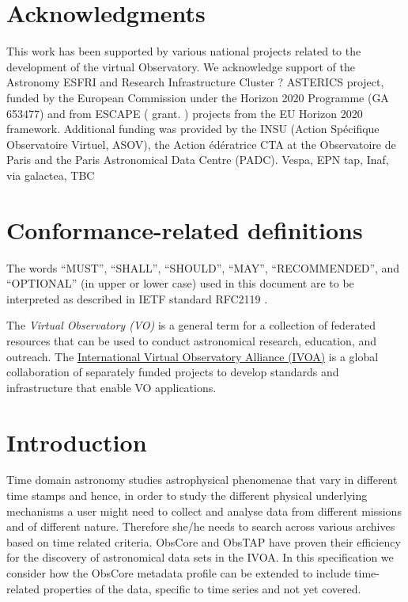 \documentclass[11pt,a4paper]{ivoa}
\begin{document}
\section*{Acknowledgments}
This work has been supported by various national projects related to the development of the virtual Observatory.
 We acknowledge support of the Astronomy ESFRI and Research Infrastructure Cluster ? ASTERICS project, funded by the European Commission under the Horizon 2020 Programme (GA 653477) and from ESCAPE ( grant. ) projects from the  EU Horizon 2020  framework.
 Additional funding was provided by the INSU (Action Sp\'{e}cifique Observatoire Virtuel, ASOV), the Action \'ed\'eratrice CTA at the Observatoire de Paris and the Paris Astronomical Data Centre (PADC).
Vespa, EPN tap, Inaf, via galactea, TBC
\section*{Conformance-related definitions}

The words ``MUST'', ``SHALL'', ``SHOULD'', ``MAY'', ``RECOMMENDED'', and
``OPTIONAL'' (in upper or lower case) used in this document are to be
interpreted as described in IETF standard RFC2119 \citep{std:RFC2119}.

The \emph{Virtual Observatory (VO)} is a
general term for a collection of federated resources that can be used
to conduct astronomical research, education, and outreach.
The \href{https://www.ivoa.net}{International
Virtual Observatory Alliance (IVOA)} is a global
collaboration of separately funded projects to develop standards and
infrastructure that enable VO applications.



\section{Introduction}

Time domain astronomy studies astrophysical phenomenae that vary in different time stamps and hence, in order to study the different physical underlying mechanisms a user might need to collect and analyse data from different missions and of different nature. Therefore she/he needs to search across various archives based on time related criteria.
ObsCore and ObsTAP  \cite{2017ivoa.spec.0509L} have proven their efficiency for the discovery of astronomical data sets in the IVOA.
In this specification we consider how the ObsCore metadata profile can be extended to include time-related properties of the data, specific to time series and not yet covered.
\end{document}

